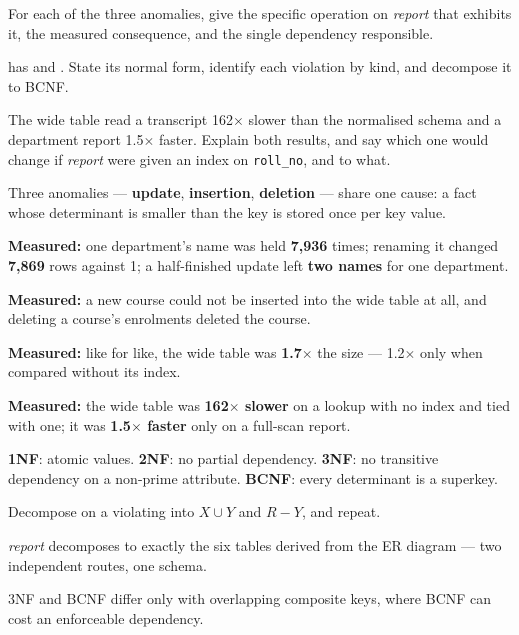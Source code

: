 \begin{checkpoint}
\begin{tightnum}
  \item For each of the three anomalies, give the specific operation on
        \textit{report} that exhibits it, the measured consequence, and the
        single dependency responsible.
  \item {} has  and
        . State its normal form, identify each violation by kind, and
        decompose it to BCNF.
  \item The wide table read a transcript 162$\times$ slower than the
        normalised schema and a department report 1.5$\times$ faster. Explain
        both results, and say which one would change if \textit{report} were
        given an index on \texttt{roll\_no}, and to what.
\end{tightnum}
\end{checkpoint}

\begin{chaptersummary}
\begin{tight}
  \item Three anomalies --- \textbf{update}, \textbf{insertion},
        \textbf{deletion} --- share one cause: a fact whose determinant is
        smaller than the key is stored once per key value.
  \item \textbf{Measured:} one department's name was held \textbf{7{,}936}
        times; renaming it changed \textbf{7{,}869} rows against 1; a
        half-finished update left \textbf{two names} for one department.
  \item \textbf{Measured:} a new course could not be inserted into the wide
        table at all, and deleting a course's enrolments deleted the course.
  \item \textbf{Measured:} like for like, the wide table was
        \textbf{1.7$\times$} the size --- 1.2$\times$ only when compared
        without its index.
  \item \textbf{Measured:} the wide table was \textbf{162$\times$ slower} on a
        lookup with no index and tied with one; it was \textbf{1.5$\times$
        faster} only on a full-scan report.
  \item \textbf{1NF}: atomic values. \textbf{2NF}: no partial dependency.
        \textbf{3NF}: no transitive dependency on a non-prime attribute.
        \textbf{BCNF}: every determinant is a superkey.
  \item Decompose on a violating  into $X \cup Y$ and $R - Y$, and
        repeat.
  \item \textit{report} decomposes to exactly the six tables 
        derived from the ER diagram --- two independent routes, one schema.
  \item 3NF and BCNF differ only with overlapping composite keys, where BCNF
        can cost an enforceable dependency.
\end{tight}
\end{chaptersummary}

